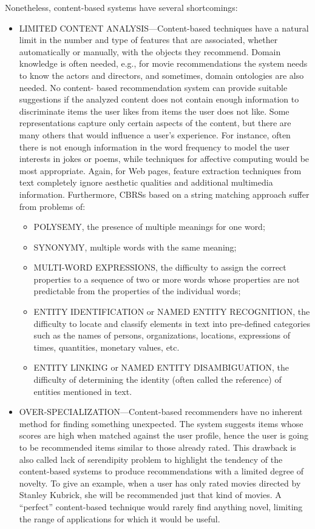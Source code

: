 Nonetheless, content-based systems have several shortcomings:

\begin{itemize}
	\item LIMITED CONTENT ANALYSIS—Content-based techniques have a natural limit in the number and type of features that are associated, whether automatically or manually, with the objects they recommend. Domain knowledge is often needed, e.g., for movie recommendations the system needs to know the actors and directors, and sometimes, domain ontologies are also needed. No content- based recommendation system can provide suitable suggestions if the analyzed content does not contain enough information to discriminate items the user likes from items the user does not like. Some representations capture only certain aspects of the content, but there are many others that would influence a user’s experience. For instance, often there is not enough information in the word frequency to model the user interests in jokes or poems, while techniques for affective computing would be most appropriate. Again, for Web pages, feature extraction techniques from text completely ignore aesthetic qualities and additional multimedia information. Furthermore, CBRSs based on a string matching approach suffer from problems of:
	\begin{itemize}
		\item POLYSEMY, the presence of multiple meanings for one word;
		\item SYNONYMY, multiple words with the same meaning;
		\item MULTI-WORD EXPRESSIONS, the difficulty to assign the correct properties to
		a sequence of two or more words whose properties are not predictable from
		the properties of the individual words;
		\item ENTITY IDENTIFICATION or NAMED ENTITY RECOGNITION, the difficulty
		to locate and classify elements in text into pre-defined categories such as the names of persons, organizations, locations, expressions of times, quantities, monetary values, etc.
		\item ENTITY LINKING or NAMED ENTITY DISAMBIGUATION, the difficulty of determining the identity (often called the reference) of entities mentioned in text.
	\end{itemize}
	\item OVER-SPECIALIZATION—Content-based recommenders have no inherent method for finding something unexpected. The system suggests items whose scores are high when matched against the user profile, hence the user is going to be recommended items similar to those already rated. This drawback is also called lack of serendipity problem to highlight the tendency of the content-based systems to produce recommendations with a limited degree of novelty. To give an example, when a user has only rated movies directed by Stanley Kubrick, she will be recommended just that kind of movies. A “perfect” content-based technique would rarely find anything novel, limiting the range of applications for which it would be useful.

\end{itemize}
